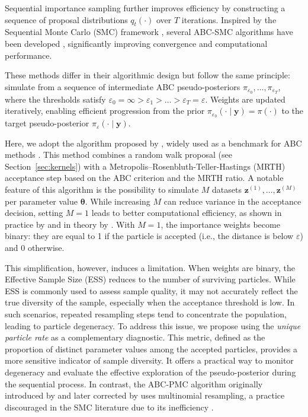 \documentclass[lineno]{biometrika}
\def\obsdata{\mathbf{y}}
\def\param{\boldsymbol{\theta}}
\def\simdata{\mathbf{z}}
\begin{document}
Sequential importance sampling further improves efficiency by constructing a sequence of proposal distributions \( q_t(\cdot) \) over \( T \) iterations. Inspired by the Sequential Monte Carlo (SMC) framework \citep{delmoralSequentialMonteCarlo2006a}, several ABC-SMC algorithms have been developed \citep{sisson2007sequential,sissonCorrectionSissonSequential2009, toniApproximateBayesianComputation2008, beaumontAdaptiveApproximateBayesian2009b, delmoralAdaptiveSequentialMonte2012}, significantly improving convergence and computational performance.

These methods differ in their algorithmic design but follow the same principle: simulate from a sequence of intermediate ABC pseudo-posteriors \( \pi_{\varepsilon_0}, \dots, \pi_{\varepsilon_T} \), where the thresholds satisfy \( \varepsilon_0 = \infty > \varepsilon_1 > \dots > \varepsilon_T = \varepsilon \). Weights are updated iteratively, enabling efficient progression from the prior \( \pi_{\varepsilon_0}(\cdot \mid \obsdata) = \pi(\cdot) \) to the target pseudo-posterior \( \pi_\varepsilon(\cdot \mid \obsdata) \).

Here, we adopt the algorithm proposed by \citet{delmoralAdaptiveSequentialMonte2012}, widely used as a benchmark for ABC methods \citep{clarte2021componentwise}. This method combines a random walk proposal (see Section~\ref{sec:kernels}) with a Metropolis–Rosenbluth-Teller-Hastings (MRTH) acceptance step based on the ABC criterion and the MRTH ratio. 
%
A notable feature of this algorithm is the possibility to simulate \( M \) datasets \( \simdata^{(1)}, \dots, \simdata^{(M)} \) per parameter value \( \param \). 
While increasing \( M \) can reduce variance in the acceptance decision, setting \( M = 1 \) leads to better computational efficiency, as shown in practice by \citet{delmoralAdaptiveSequentialMonte2012} and in theory by \citet{bornn2017use}. 
With $M=1$, the importance weights become binary: they are equal to 1 if the particle is accepted (i.e., the distance is below \( \varepsilon \)) and 0 otherwise.

This simplification, however, induces a limitation. When weights are binary, the Effective Sample Size (ESS) reduces to the number of surviving particles. While ESS is commonly used to assess sample quality, it may not accurately reflect the true diversity of the sample, especially when the acceptance threshold is low. In such scenarios, repeated resampling steps tend to concentrate the population, leading to particle degeneracy. 
To address this issue, we propose using the \emph{unique particle rate} as a complementary diagnostic. This metric, defined as the proportion of distinct parameter values among the accepted particles, provides a more sensitive indicator of sample diversity. It offers a practical way to monitor degeneracy and evaluate the effective exploration of the pseudo-posterior during the sequential process. 
In contrast, the ABC-PMC algorithm originally introduced by \citet{sissonCorrectionSissonSequential2009} and later corrected by \citet{beaumontAdaptiveApproximateBayesian2009b} uses multinomial resampling, a practice discouraged in the SMC literature due to its inefficiency \citep{chopin2020introduction}.
\end{document}
